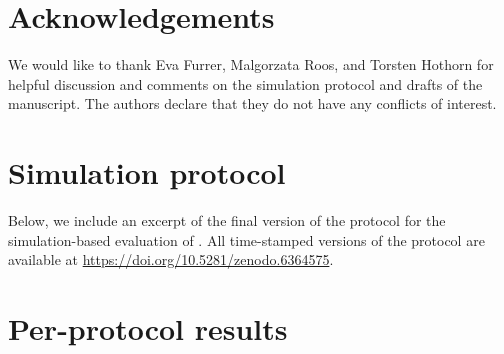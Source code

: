 \documentclass[a4paper, 11pt]{article}
\begin{document}
\section*{Acknowledgements}
We would like to thank Eva Furrer, Malgorzata Roos, and Torsten Hothorn for 
helpful discussion and comments on the simulation protocol and drafts of the
manuscript.
The authors declare that they do not have any conflicts of interest.

\begin{appendices}

\section{Simulation protocol}
\label{appendix:protocol}

Below, we include an excerpt of the final version of the protocol for the 
simulation-based evaluation of \ainet{}. All time-stamped versions
of the protocol are available at \url{https://doi.org/10.5281/zenodo.6364575}.



\section{Per-protocol results}
\label{appendix:per-protocol-results}



\end{appendices}



\end{document}
